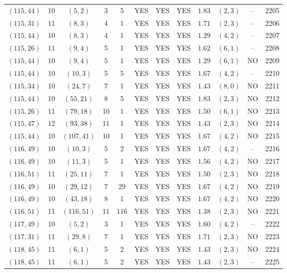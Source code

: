 \begin{longtable}{|c|c|c|c|c|c|c|c|c|c|c|c|}
$(115,44)$ & 10 & $(5,2)$ & 3 & 5 & YES & YES & YES & $1.83$ & $(2,3)$ & -- & 2205\\
$(115,31)$ & 11 & $(8,3)$ & 4 & 1 & YES & YES & YES & $1.71$ & $(2,3)$ & -- & 2206\\
$(115,44)$ & 10 & $(8,3)$ & 4 & 1 & YES & YES & YES & $1.29$ & $(4,2)$ & -- & 2207\\
$(115,26)$ & 11 & $(9,4)$ & 5 & 1 & YES & YES & YES & $1.62$ & $(6,1)$ & -- & 2208\\
$(115,44)$ & 10 & $(9,4)$ & 5 & 1 & YES & YES & YES & $1.29$ & $(6,1)$ & NO & 2209\\
$(115,44)$ & 10 & $(10,3)$ & 5 & 5 & YES & YES & YES & $1.67$ & $(4,2)$ & -- & 2210\\
$(115,34)$ & 10 & $(24,7)$ & 7 & 1 & YES & YES & YES & $1.43$ & $(8,0)$ & NO & 2211\\
$(115,44)$ & 10 & $(55,21)$ & 8 & 5 & YES & YES & YES & $1.83$ & $(2,3)$ & NO & 2212\\
$(115,26)$ & 11 & $(79,18)$ & 10 & 1 & YES & YES & YES & $1.50$ & $(6,1)$ & NO & 2213\\
$(115,47)$ & 12 & $(93,38)$ & 11 & 1 & YES & YES & YES & $1.43$ & $(2,3)$ & NO & 2214\\
$(115,44)$ & 10 & $(107,41)$ & 10 & 1 & YES & YES & YES & $1.67$ & $(4,2)$ & NO & 2215\\
$(116,49)$ & 10 & $(10,3)$ & 5 & 2 & YES & YES & YES & $1.67$ & $(4,2)$ & -- & 2216\\
$(116,49)$ & 10 & $(11,3)$ & 5 & 1 & YES & YES & YES & $1.56$ & $(4,2)$ & NO & 2217\\
$(116,51)$ & 11 & $(25,11)$ & 7 & 1 & YES & YES & YES & $1.50$ & $(2,3)$ & NO & 2218\\
$(116,49)$ & 10 & $(29,12)$ & 7 & 29 & YES & YES & YES & $1.67$ & $(4,2)$ & NO & 2219\\
$(116,49)$ & 10 & $(43,18)$ & 8 & 1 & YES & YES & YES & $1.67$ & $(4,2)$ & NO & 2220\\
$(116,51)$ & 11 & $(116,51)$ & 11 & 116 & YES & YES & YES & $1.38$ & $(2,3)$ & NO & 2221\\
$(117,49)$ & 10 & $(5,2)$ & 3 & 1 & YES & YES & YES & $1.60$ & $(4,2)$ & -- & 2222\\
$(117,31)$ & 11 & $(29,8)$ & 7 & 1 & YES & YES & YES & $1.71$ & $(2,3)$ & NO & 2223\\
$(118,45)$ & 11 & $(6,1)$ & 5 & 2 & YES & YES & YES & $1.43$ & $(2,3)$ & NO & 2224\\
$(118,45)$ & 11 & $(6,1)$ & 5 & 2 & YES & YES & YES & $1.43$ & $(2,3)$ & -- & 2225\\

\end{longtable}
